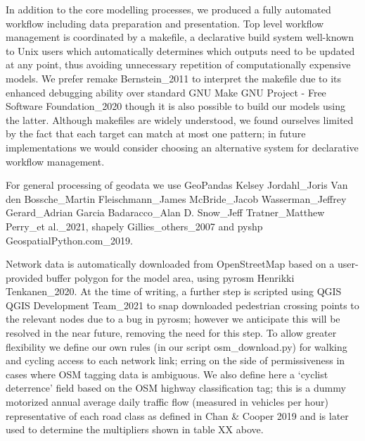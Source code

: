 \documentclass[galley]{jtlu-article-2col}
\begin{document}
In addition to the core modelling processes, we produced a fully automated workflow including data preparation and presentation.
Top level workflow management is coordinated by a makefile, a declarative build system well-known to Unix users which automatically determines which outputs need to be updated at any point, thus avoiding unnecessary repetition of computationally expensive models. We prefer remake Bernstein\_2011 to interpret the makefile due to its enhanced debugging ability over standard GNU Make GNU Project - Free Software Foundation\_2020 though it is also possible to build our models using the latter. Although makefiles are widely understood, we found ourselves limited by the fact that each target can match at most one pattern; in future implementations we would consider choosing an alternative system for declarative workflow management.

For general processing of geodata we use GeoPandas Kelsey Jordahl\_Joris Van den Bossche\_Martin Fleischmann\_James McBride\_Jacob Wasserman\_Jeffrey Gerard\_Adrian Garcia Badaracco\_Alan D. Snow\_Jeff Tratner\_Matthew Perry\_et al.\_2021, shapely Gillies\_others\_2007 and pyshp GeospatialPython.com\_2019.

Network data is automatically downloaded from OpenStreetMap based on a user-provided buffer polygon for the model area, using pyrosm Henrikki Tenkanen\_2020. At the time of writing, a further step is scripted using QGIS QGIS Development Team\_2021 to snap downloaded pedestrian crossing points to the relevant nodes due to a bug in pyrosm; however we anticipate this will be resolved in the near future, removing the need for this step. To allow greater flexibility we define our own rules (in our script osm\_download.py) for walking and cycling access to each network link; erring on the side of permissiveness in cases where OSM tagging data is ambiguous. We also define here a `cyclist deterrence' field based on the OSM highway classification tag; this is a dummy motorized annual average daily traffic flow (measured in vehicles per hour) representative of each road class as defined in Chan \& Cooper 2019 and is later used to determine the multipliers shown in table XX above.
\end{document}
